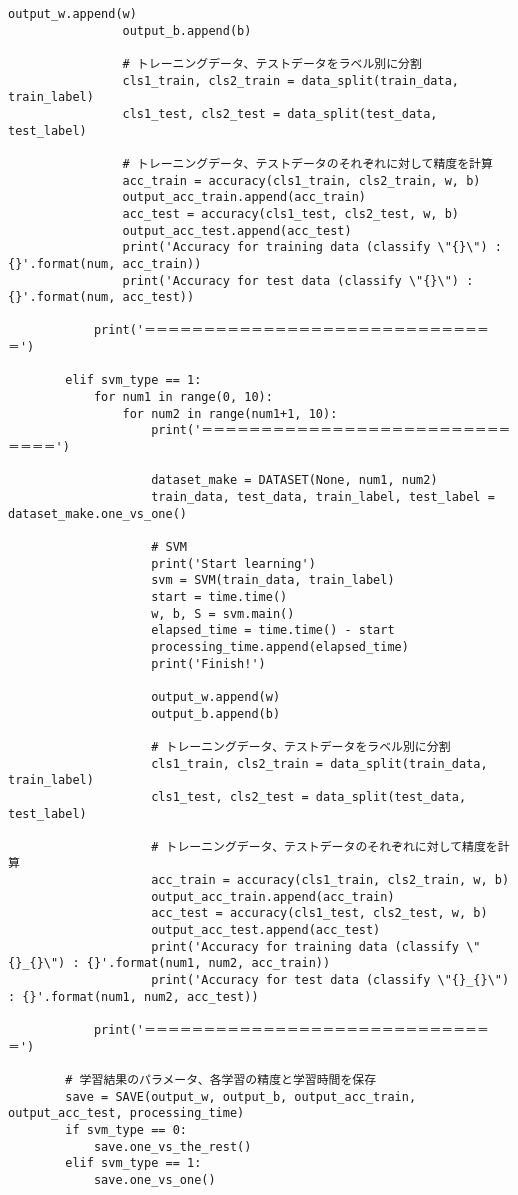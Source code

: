 \begin{lstlisting}[caption=課題2のMNISTの数字画像識別におけるSVM学習用プログラム]
                output_w.append(w)
                output_b.append(b)

                # トレーニングデータ、テストデータをラベル別に分割
                cls1_train, cls2_train = data_split(train_data, train_label)
                cls1_test, cls2_test = data_split(test_data, test_label)

                # トレーニングデータ、テストデータのそれぞれに対して精度を計算
                acc_train = accuracy(cls1_train, cls2_train, w, b)
                output_acc_train.append(acc_train)
                acc_test = accuracy(cls1_test, cls2_test, w, b)
                output_acc_test.append(acc_test)
                print('Accuracy for training data (classify \"{}\") : {}'.format(num, acc_train))
                print('Accuracy for test data (classify \"{}\") : {}'.format(num, acc_test))

            print('＝＝＝＝＝＝＝＝＝＝＝＝＝＝＝＝＝＝＝＝＝＝＝＝＝＝＝＝＝＝')

        elif svm_type == 1:
            for num1 in range(0, 10):
                for num2 in range(num1+1, 10):
                    print('＝＝＝＝＝＝＝＝＝＝＝＝＝＝＝＝＝＝＝＝＝＝＝＝＝＝＝＝＝＝')

                    dataset_make = DATASET(None, num1, num2)
                    train_data, test_data, train_label, test_label = dataset_make.one_vs_one()

                    # SVM
                    print('Start learning')
                    svm = SVM(train_data, train_label)
                    start = time.time()
                    w, b, S = svm.main()
                    elapsed_time = time.time() - start
                    processing_time.append(elapsed_time)
                    print('Finish!')

                    output_w.append(w)
                    output_b.append(b)

                    # トレーニングデータ、テストデータをラベル別に分割
                    cls1_train, cls2_train = data_split(train_data, train_label)
                    cls1_test, cls2_test = data_split(test_data, test_label)

                    # トレーニングデータ、テストデータのそれぞれに対して精度を計算
                    acc_train = accuracy(cls1_train, cls2_train, w, b)
                    output_acc_train.append(acc_train)
                    acc_test = accuracy(cls1_test, cls2_test, w, b)
                    output_acc_test.append(acc_test)
                    print('Accuracy for training data (classify \"{}_{}\") : {}'.format(num1, num2, acc_train))
                    print('Accuracy for test data (classify \"{}_{}\") : {}'.format(num1, num2, acc_test))

            print('＝＝＝＝＝＝＝＝＝＝＝＝＝＝＝＝＝＝＝＝＝＝＝＝＝＝＝＝＝＝')

        # 学習結果のパラメータ、各学習の精度と学習時間を保存
        save = SAVE(output_w, output_b, output_acc_train, output_acc_test, processing_time)
        if svm_type == 0:
            save.one_vs_the_rest()
        elif svm_type == 1:
            save.one_vs_one()
\end{lstlisting}